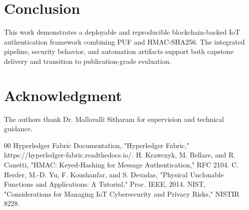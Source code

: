 \documentclass[conference]{IEEEtran}
\begin{document}
\section{Conclusion}
This work demonstrates a deployable and reproducible blockchain-backed IoT authentication framework combining PUF and HMAC-SHA256. The integrated pipeline, security behavior, and automation artifacts support both capstone delivery and transition to publication-grade evaluation.

\section*{Acknowledgment}
The authors thank Dr. Mallavalli Sitharam for supervision and technical guidance.

\begin{thebibliography}{00}
 Hyperledger Fabric Documentation, "Hyperledger Fabric," https://hyperledger-fabric.readthedocs.io/.
 H. Krawczyk, M. Bellare, and R. Canetti, "HMAC: Keyed-Hashing for Message Authentication," RFC 2104.
 C. Herder, M.-D. Yu, F. Koushanfar, and S. Devadas, "Physical Unclonable Functions and Applications: A Tutorial," Proc. IEEE, 2014.
 NIST, "Considerations for Managing IoT Cybersecurity and Privacy Risks," NISTIR 8228.
\end{thebibliography}
\end{document}
